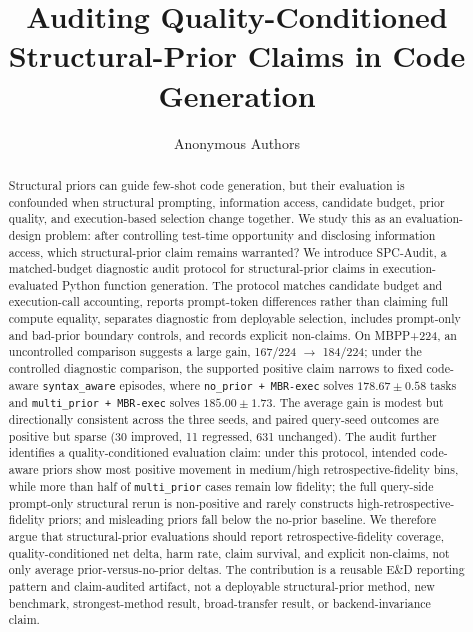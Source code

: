 \documentclass{article}
\title{Auditing Quality-Conditioned Structural-Prior Claims in Code Generation}
\author{Anonymous Authors}
\begin{document}
\maketitle
\begin{abstract}
Structural priors can guide few-shot code generation, but their evaluation is confounded when structural prompting, information access, candidate budget, prior quality, and execution-based selection change together. We study this as an evaluation-design problem: after controlling test-time opportunity and disclosing information access, which structural-prior claim remains warranted? We introduce SPC-Audit, a matched-budget diagnostic audit protocol for structural-prior claims in execution-evaluated Python function generation. The protocol matches candidate budget and execution-call accounting, reports prompt-token differences rather than claiming full compute equality, separates diagnostic from deployable selection, includes prompt-only and bad-prior boundary controls, and records explicit non-claims. On MBPP+224, an uncontrolled comparison suggests a large gain, 167/224 $\to$ 184/224; under the controlled diagnostic comparison, the supported positive claim narrows to fixed code-aware \texttt{syntax\_aware} episodes, where \texttt{no\_prior + MBR-exec} solves $178.67 \pm 0.58$ tasks and \texttt{multi\_prior + MBR-exec} solves $185.00 \pm 1.73$. The average gain is modest but directionally consistent across the three seeds, and paired query-seed outcomes are positive but sparse (30 improved, 11 regressed, 631 unchanged). The audit further identifies a quality-conditioned evaluation claim: under this protocol, intended code-aware priors show most positive movement in medium/high retrospective-fidelity bins, while more than half of \texttt{multi\_prior} cases remain low fidelity; the full query-side prompt-only structural rerun is non-positive and rarely constructs high-retrospective-fidelity priors; and misleading priors fall below the no-prior baseline. We therefore argue that structural-prior evaluations should report retrospective-fidelity coverage, quality-conditioned net delta, harm rate, claim survival, and explicit non-claims, not only average prior-versus-no-prior deltas. The contribution is a reusable E\&D reporting pattern and claim-audited artifact, not a deployable structural-prior method, new benchmark, strongest-method result, broad-transfer result, or backend-invariance claim.
\end{abstract}
\end{document}
